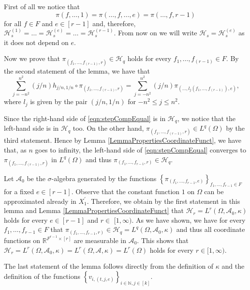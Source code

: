 \documentclass[11pt]{article}
\begin{document}
First of all we notice that
$$
\pi(f,\ldots,1) =\pi(\ldots,f,\ldots,e)=\pi(\ldots,f,r-1)
$$for all $f\in F$ and $e\in [r-1]$ and, therefore, $\mathcal{H}^{(1)}_{s}=\ldots=\mathcal{H}^{(e)}_{s}=\ldots=\mathcal{H}^{(r-1)}_{s}$. From now on we will write $\mathcal{H}_s=\mathcal{H}^{(e)}_s$ as it does not depend on $e$.

Now we prove that $\pi_{(f_1,\ldots,f_{(r-1)}, r)} \in \mathcal{H}_{q}$ holds for every $f_1,\ldots, f_{(r-1)} \in F$. By the second statement of the lemma, we have that
 \begin{equation}\label{eqn:stepCompEqual}
\sum_{j=-n^{2}}^{n^{2}}(j / n) h_{j / n, 1 / n} \circ \pi_{(f_1,\ldots, f_{(r-1)}, r)}=\sum_{j=-n^{2}}^{n^{2}}(j / n) \pi_{(\ldots,l_j(f_1,\ldots,f_{(r-1)}), e)},
\end{equation}
where $l_{j}$ is given by the pair $(j / n, 1 / n)$ for $-n^{2} \leq j \leq n^{2}$. 

Since the right-hand side of \eqref{eqn:stepCompEqual} is in $\mathcal{H}_{q}$, we notice that the left-hand side is in $\mathcal{H}_{q}$ too. On the other hand, $\pi_{(f_1, \ldots,f_{(r-1)},r)} \in L^{q}(\Omega)$ by the third statement. Hence by Lemma \ref{LemmaPropertiesCoordinateFunct}, we have that,
as $n$ goes to infinity, the left-hand side of \eqref{eqn:stepCompEqual} converges to $\pi_{(f_1,\ldots,f_{(r-1)}, r)}$ in $L^{q}(\Omega)$ and thus $\pi_{(f_1,\ldots,f_{r-1}, r)} \in \mathcal{H}_{q} .$

Let $\mathcal{A}_{0}$ be the $\sigma$-algebra generated by the functions $\left\{\pi_{(f_1,\ldots,f_{r-1}, e)}\right\}_{f_1,\ldots,f_{r-1} \in F}$ for a fixed $e\in [r-1]$. Observe that the constant function $1$ on $\Omega$ can be approximated already in $X_{1}^{\prime}$. Therefore, we obtain by the first statement in this lemma and Lemma \ref{LemmaPropertiesCoordinateFunct} that $\mathcal{H}_{r}=L^{r}\left(\Omega, \mathcal{A}_{0}, \kappa\right)$ holds for every $e\in [r-1]$ and $r \in$ $[1, \infty)$. As we have shown, we have for every $f_1,\ldots, f_{r-1}\in F$ that $\pi_{(f_1,\ldots,f_{r-1}, r)} \in \mathcal{H}_{q}=L^{q}\left(\Omega, \mathcal{A}_{0}, \kappa\right)$ and thus all coordinate functions on $\mathbb{R}^{F^{r-1} \times[r]}$ are measurable in $\mathcal{A}_{0}$. This shows that $\mathcal{H}_{r}=L^{r}\left(\Omega, \mathcal{A}_{0}, \kappa\right)=L^{r}(\Omega, \mathcal{A}, \kappa)=L^{r}(\Omega)$ holds for every $r \in[1, \infty)$.

The last statement of the lemma follows directly from the definition of $\kappa$ and the definition of the functions $\left\{v_{i,(t, j,e)}\right\}_{i \in \mathbb{N}, j \in[k]}$.
\endproof
\end{document}
